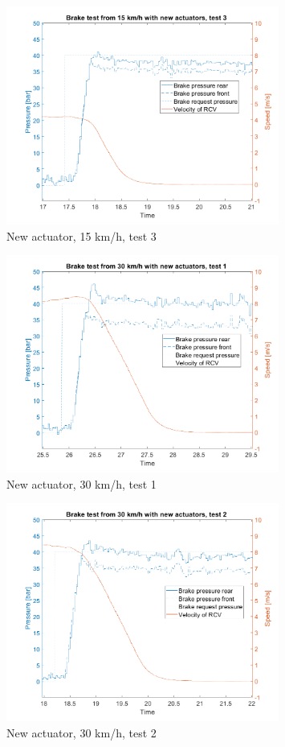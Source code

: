 \documentclass[a4paper,11pt]{kth-mag}
\begin{document}
\begin{figure}[h]
\centering
\includegraphics[width=0.8\textwidth]{New_15kph_test3}
\caption{New actuator, 15 km/h, test 3}
\label{fig:New_15kph_test3}
\end{figure}

\begin{figure}[h]
\centering
\includegraphics[width=0.8\textwidth]{New_30kph_test1}
\caption{New actuator, 30 km/h, test 1}
\label{fig:New_30kph_test1}
\end{figure}

\begin{figure}[h]
\centering
\includegraphics[width=0.8\textwidth]{New_30kph_test2}
\caption{New actuator, 30 km/h, test 2}
\label{fig:New_30kph_test2}
\end{figure}
\end{document}
